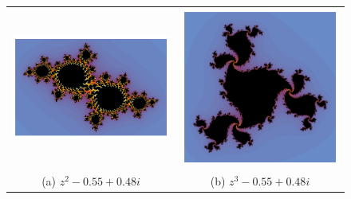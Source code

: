 \begin{figure}[ht]
  \centering
  \begin{tabular}{cc}
    \includegraphics[scale=0.55]{./img/C3/julia-generalizado-2.png} &   \includegraphics[scale=0.4]{./img/C3/julia-generalizado-3.png} \\
  (a) $z^2-0.55+0.48i$ & (b) $z^3-0.55+0.48i$ \\[6pt]

\end{tabular}
\end{figure}
